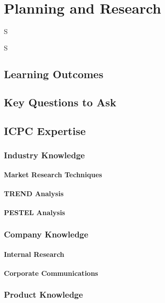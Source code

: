 \frenchspacing
\chapter{Planning and Research}
\epigraph{S}{S}

%
\section{Learning Outcomes}\mbox{}

\section{Key Questions to Ask}\mbox{}

\section{ICPC Expertise}\mbox{}
    \subsection{Industry Knowledge}\mbox{}
        \subsubsection{Market Research Techniques}\mbox{}
        \subsubsection{TREND Analysis}\mbox{}
        \subsubsection{PESTEL Analysis}\mbox{}
    \subsection{Company Knowledge}\mbox{}
        \subsubsection{Internal Research}\mbox{}
        \subsubsection{Corporate Communications}\mbox{}
    \subsection{Product Knowledge}\mbox{}
